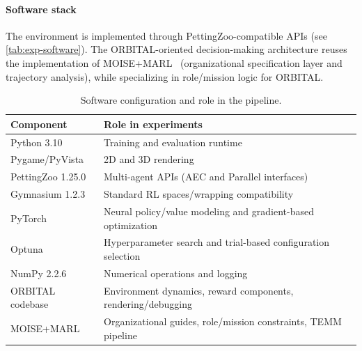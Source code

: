 \documentclass[sigconf]{aamas}
\begin{document}
\paragraph{Software stack}
The environment is implemented through PettingZoo-compatible APIs (see \autoref{tab:exp-software}). The ORBITAL-oriented decision-making architecture reuses the implementation of MOISE+MARL~\hyperref[fn:github-mma]{\footnotemark[2]} \cite{soule2024moise_marl} (organizational specification layer and trajectory analysis), while specializing in role/mission logic for ORBITAL.

\begin{table}[h!]
    \caption{Software configuration and role in the pipeline.}
    \label{tab:exp-software}
    \centering
    \scriptsize
    \begin{tabularx}{\columnwidth}{p{2.2cm} X}
        \toprule
        Component                                    & Role in experiments                                            \\
        \midrule
        Python 3.10                                  & Training and evaluation runtime                                \\
        Pygame/PyVista                               & 2D and 3D rendering                                            \\
        PettingZoo 1.25.0 \cite{terry2020pettingzoo} & Multi-agent APIs (AEC and Parallel interfaces)                 \\
        Gymnasium 1.2.3 \cite{kwiatkowski2024}       & Standard RL spaces/wrapping compatibility                      \\
        PyTorch \cite{Imambi2021}                    & Neural policy/value modeling and gradient-based optimization   \\
        Optuna \cite{akiba2019optuna}                & Hyperparameter search and trial-based configuration selection  \\
        NumPy 2.2.6                                  & Numerical operations and logging                               \\
        ORBITAL codebase                             & Environment dynamics, reward components, rendering/debugging   \\
        MOISE+MARL \cite{soule2024moise_marl}        & Organizational guides, role/mission constraints, TEMM pipeline \\
        \bottomrule
    \end{tabularx}
\end{table}
\end{document}
